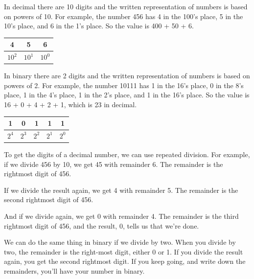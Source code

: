 

In decimal there are 10 digits and the written representation of numbers is based on powers of 10.
For example, the number 456 has 4 in the 100's place, 5 in the 10's place, and 6 in the 1's place.
So the value is 400 + 50 + 6.

\begin{center}
\begin{tabular}{|c|c|c|}
\hline
4 & 5 & 6 \\
\hline
$10^2$ & $10^1$ & $10^0$ \\
\hline
\end{tabular}
\end{center}

In binary there are 2 digits and the written representation of numbers is based on powers of 2.
For example, the number 10111 has 1 in the 16's place, 0 in the 8's place, 1 in the 4's place, 1 in the 2's place, and 1 in the 16's place.
So the value is 16 + 0 + 4 + 2 + 1, which is 23 in decimal.

\begin{center}
\begin{tabular}{|c|c|c|c|c|}
\hline
1 & 0 & 1 & 1 & 1 \\
\hline
$2^4$ & $2^3$ & $2^2$ & $2^1$ & $2^0$ \\
\hline
\end{tabular}
\end{center}

To get the digits of a decimal number, we can use repeated division.
For example, if we divide 456 by 10, we get 45 with remainder 6.
The remainder is the rightmost digit of 456.

If we divide the result again, we get 4 with remainder 5.
The remainder is the second rightmost digit of 456.

And if we divide again, we get 0 with remainder 4.
The remainder is the third rightmost digit of 456, and the result, 0, tells us that we're done.

We can do the same thing in binary if we divide by two.
When you divide by two, the remainder is the right-most digit, either 0 or 1.
If you divide the result again, you get the second rightmost digit.
If you keep going, and write down the remainders, you'll have your number in binary.

